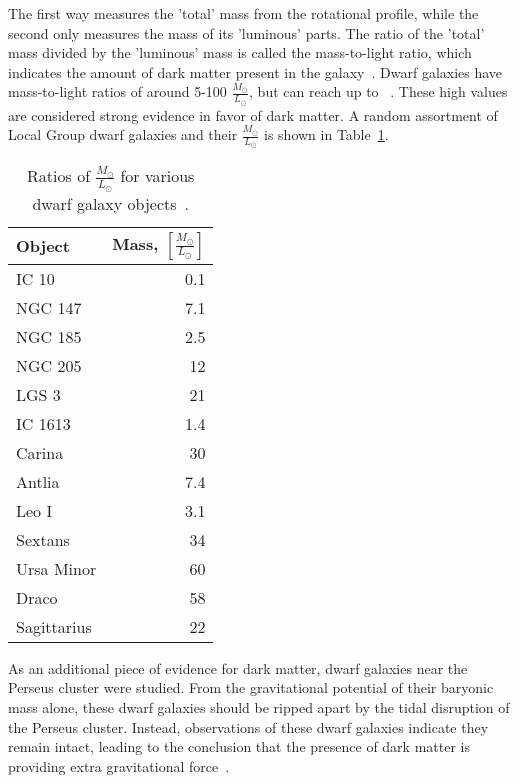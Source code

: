     The first way measures the 'total' mass from the rotational profile, while the second only measures the mass of its 'luminous' parts.
    The ratio of the 'total' mass divided by the 'luminous' mass is called the mass-to-light ratio, which indicates the amount of dark matter present in the galaxy~\cite{faber_ml}.
    Dwarf galaxies have mass-to-light ratios of around 5-100 $\frac{M_\odot}{L_\odot}$, but can reach up to ~\cite{Simon2007_dwarfgalaxykeck}.
    These high values are considered strong evidence in favor of dark matter.
    A random assortment of Local Group dwarf galaxies and their $\frac{M_\odot}{L_\odot}$ is shown in Table~\ref{tab:mlratios:dwarfgals}.
    
    \begin{table}[]
      \centering
      \caption[Ratios of $\frac{M_\odot}{L_\odot}$ for Various Dwarf Galaxy Objects]{Ratios of $\frac{M_\odot}{L_\odot}$ for various dwarf galaxy objects~\cite{localdwarfs}.}
      \label{tab:mlratios:dwarfgals}
      \begin{tabular}{l r}
        Object      &  Mass, $\left [ \frac{M_\odot}{L_\odot} \right ]$ \\
        \hline
        IC 10       &  0.1 \\
        NGC 147     &  7.1 \\
        NGC 185     &  2.5 \\
        NGC 205     & 12   \\
        LGS 3       & 21   \\
        IC 1613     &  1.4 \\
        Carina      & 30   \\
        Antlia      &  7.4 \\
        Leo I       &  3.1 \\
        Sextans     & 34   \\
        Ursa Minor  & 60   \\
        Draco       & 58   \\
        Sagittarius & 22   \\
      \end{tabular}
    \end{table}
    
    As an additional piece of evidence for dark matter, dwarf galaxies near the Perseus cluster were studied.
    From the gravitational potential of their baryonic mass alone, these dwarf galaxies should be ripped apart by the tidal disruption of the Perseus cluster.
    Instead, observations of these dwarf galaxies indicate they remain intact, leading to the conclusion that the presence of dark matter is providing extra gravitational force~\cite{Penny2009}.
    

